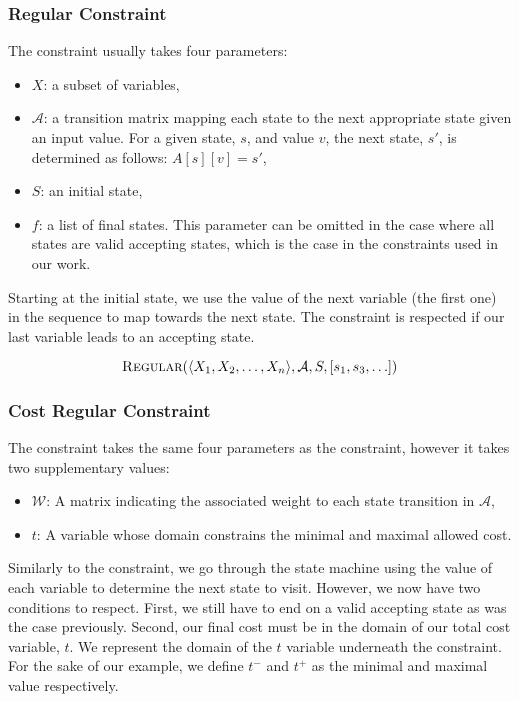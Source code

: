 \documentclass[../Document.tex]{subfiles}
\begin{document}
\subsubsection{Regular Constraint}
The \regular constraint usually takes four parameters:
\begin{itemize}
    \item $X$: a subset of variables,
    \item $\mathcal{A}$: a transition matrix mapping each state to the next appropriate state given an input value. For a given state, $s$, and value $v$, the next state, $s'$, is determined as follows: $A[s][v] = s'$,
    \item $S$: an initial state,
    \item $f$: a list of final states. This parameter can be omitted in the case where all states are valid accepting states, which is the case in the \regular constraints used in our work.
\end{itemize}

Starting at the initial state, we use the value of the next variable (\ie the first one) in the sequence to map towards the next state. The constraint is respected if our last variable leads to an accepting state.

$$
    \mbox{\sc Regular}(\langle X_1, X_2, \ldots, X_n \rangle, \mathcal{A}, S, [s_1, s_3, \ldots])
$$

\subsubsection{Cost Regular Constraint}
The \costregular constraint takes the same four parameters as the \regular constraint, however it takes two supplementary values:
\begin{itemize}
    \item $\mathcal{W}$: A matrix indicating the associated weight to each state transition in $\mathcal{A}$,
    \item $t$: A variable whose domain constrains the minimal and maximal allowed cost.
\end{itemize}

Similarly to the \regular constraint, we go through the state machine using the value of each variable to determine the next state to visit.
However, we now have two conditions to respect. First, we still have to end on a valid accepting state as was the case previously. Second, our final cost must be in the domain of our total cost variable, $t$.
We represent the domain of the $t$ variable underneath the \costregular constraint. For the sake of our example, we define $t^-$ and $t^+$ as the minimal and maximal value respectively.
\end{document}
